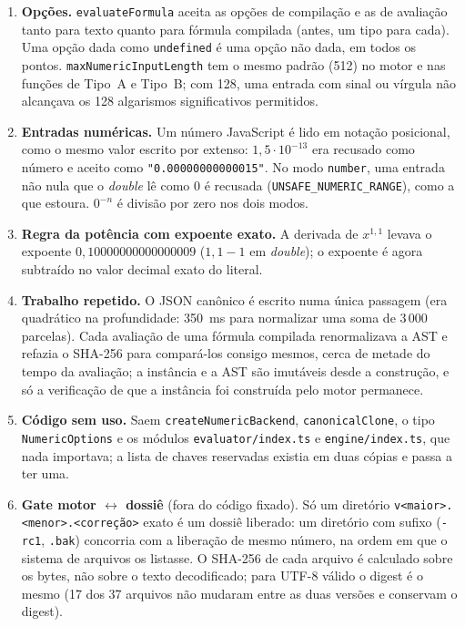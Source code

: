 \documentclass[11pt,a4paper]{article}
\begin{document}
\begin{enumerate}[label=(\alph*)]
  \item \textbf{Opções.} \texttt{evaluateFormula} aceita as opções de compilação e as de avaliação tanto para texto quanto para fórmula compilada (antes, um tipo para cada). Uma opção dada como \texttt{undefined} é uma opção não dada, em todos os pontos. \texttt{maxNumericInputLength} tem o mesmo padrão (512) no motor e nas funções de Tipo~A e Tipo~B; com 128, uma entrada com sinal ou vírgula não alcançava os 128 algarismos significativos permitidos.
  \item \textbf{Entradas numéricas.} Um número JavaScript é lido em notação posicional, como o mesmo valor escrito por extenso: \(1{,}5 \cdot 10^{-13}\) era recusado como número e aceito como \texttt{"0.00000000000015"}. No modo \texttt{number}, uma entrada não nula que o \emph{double} lê como 0 é recusada (\texttt{UNSAFE\_NUMERIC\_RANGE}), como a que estoura. \(0^{-n}\) é divisão por zero nos dois modos.
  \item \textbf{Regra da potência com expoente exato.} A derivada de \(x^{1{,}1}\) levava o expoente \(0{,}10000000000000009\) (\(1{,}1 - 1\) em \emph{double}); o expoente é agora subtraído no valor decimal exato do literal.
  \item \textbf{Trabalho repetido.} O JSON canônico é escrito numa única passagem (era quadrático na profundidade: 350~ms para normalizar uma soma de 3\,000 parcelas). Cada avaliação de uma fórmula compilada renormalizava a AST e refazia o SHA-256 para compará-los consigo mesmos, cerca de metade do tempo da avaliação; a instância e a AST são imutáveis desde a construção, e só a verificação de que a instância foi construída pelo motor permanece.
  \item \textbf{Código sem uso.} Saem \texttt{createNumericBackend}, \texttt{canonicalClone}, o tipo \texttt{NumericOptions} e os módulos \texttt{evaluator/index.ts} e \texttt{engine/index.ts}, que nada importava; a lista de chaves reservadas existia em duas cópias e passa a ter uma.
  \item \textbf{Gate motor \(\leftrightarrow\) dossiê} (fora do código fixado). Só um diretório \texttt{v<maior>.<menor>.<correção>} exato é um dossiê liberado: um diretório com sufixo (\texttt{-rc1}, \texttt{.bak}) concorria com a liberação de mesmo número, na ordem em que o sistema de arquivos os listasse. O SHA-256 de cada arquivo é calculado sobre os bytes, não sobre o texto decodificado; para UTF-8 válido o digest é o mesmo (17 dos 37 arquivos não mudaram entre as duas versões e conservam o digest).
\end{enumerate}
\end{document}
